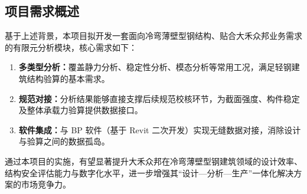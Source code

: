 \subsection{项目需求概述}
基于上述背景，本项目拟开发一套面向冷弯薄壁型钢结构、贴合大禾众邦业务需求的有限元分析模块，核心需求如下：

\begin{enumerate}[label=\arabic*., leftmargin=2em]
    \item \textbf{多类型分析：}覆盖静力分析、稳定性分析、模态分析等常用工况，满足轻钢建筑结构验算的基本需求。
    \item \textbf{规范对接：}分析结果能够直接支撑后续规范校核环节，为截面强度、构件稳定及整体承载力验算提供数据接口。
    \item \textbf{软件集成：}与 BP 软件（基于 Revit 二次开发）实现无缝数据对接，消除设计与验算之间的数据孤岛。
\end{enumerate}

通过本项目的实施，有望显著提升大禾众邦在冷弯薄壁型钢建筑领域的设计效率、结构安全评估能力与数字化水平，进一步增强其“设计—分析—生产”一体化解决方案的市场竞争力。